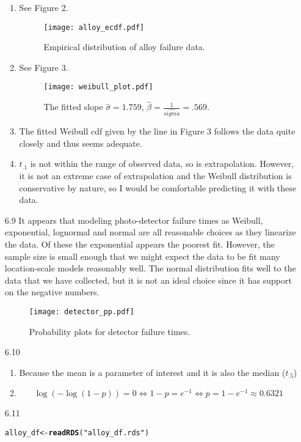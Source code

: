 \documentclass[12pt]{article}\usepackage[]{graphicx}\usepackage[]{color}
\makeatletter
\newcommand{\hlstr}[1]{\textcolor[rgb]{0.192,0.494,0.8}{#1}}%
\newcommand{\hlstd}[1]{\textcolor[rgb]{0.345,0.345,0.345}{#1}}%
\newcommand{\hlkwb}[1]{\textcolor[rgb]{0.69,0.353,0.396}{#1}}%
\newcommand{\hlkwd}[1]{\textcolor[rgb]{0.737,0.353,0.396}{\textbf{#1}}}%
\newenvironment{kframe}{%
 \def\at@end@of@kframe{}%
 \ifinner\ifhmode%
  \def\at@end@of@kframe{\end{minipage}}%
  \begin{minipage}{\columnwidth}%
 \fi\fi%
 \def\FrameCommand##1{\hskip\@totalleftmargin \hskip-\fboxsep
 \colorbox{shadecolor}{##1}\hskip-\fboxsep
     \hskip-\linewidth \hskip-\@totalleftmargin \hskip\columnwidth}%
 \MakeFramed {\advance\hsize-\width
   \@totalleftmargin\z@ \linewidth\hsize
   \@setminipage}}%
 {\par\unskip\endMakeFramed%
 \at@end@of@kframe}
\newenvironment{knitrout}{}{} %
\makeatother
\begin{document}
\begin{enumerate}
\begin{enumerate}
    \item See Figure 2.
    \begin{figure}
      \texttt{[image: alloy\_ecdf.pdf]}
      \caption{Empirical distribution of alloy failure data.}
    \end{figure}
    \item See Figure 3.
    \begin{figure}
      \texttt{[image: weibull\_plot.pdf]}
      \caption{The fitted slope $\widehat{\sigma}=1.759$, $\widehat{\beta} = \frac{1}{\widehat{sigma}} = .569$.}
      \end{figure}
    \item
    The fitted Weibull cdf given by the line in Figure 3 follows the data quite closely and thus seems adequate. 
    \item
    $t_{.1}$ is not within the range of observed data, so is extrapolation. However, it is not an extreme case of extrapolation and the Weibull distribution is conservative by nature, so I would be comfortable predicting it with these data.
  \end{enumerate}
  \item[6.9]
  It appears that modeling photo-detector failure times as Weibull, exponential, lognormal and normal are all reasonable choices as they linearize the data. Of these the exponential appears the poorest fit. However, the sample size is small enough that we might expect the data to be fit many location-scale models reasonably well. The normal distribution fits well to the data that we have collected, but it is not an ideal choice since it has support on the negative numbers.
  
  \begin{figure}
    \texttt{[image: detector\_pp.pdf]}
    \caption{Probability plots for detector failure times.}
  \end{figure}
  
  \item[6.10]
  \begin{enumerate}
    \item Because the mean is a parameter of interest and it is also the median ($t_{.5}$)
    \item
    \[\log(-\log(1-p)) = 0 \iff 1-p = e^{-1} \iff p = 1 - e^{-1} \approx 0.6321\]
  \end{enumerate}
  \item[6.11]
\begin{knitrout}
\color{fgcolor}\begin{kframe}
\begin{alltt}
\hlstd{alloy_df} \hlkwb{<-} \hlkwd{readRDS}\hlstd{(}\hlstr{"alloy_df.rds"}\hlstd{)}


\end{alltt}
\end{kframe}
\end{knitrout}
\end{enumerate}
\end{document}
